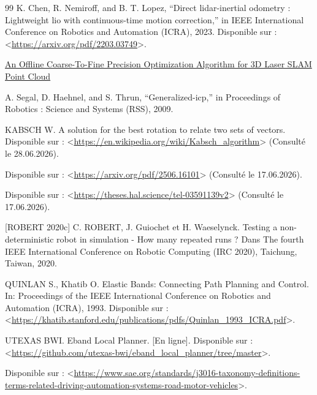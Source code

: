 \begin{thebibliography}{99}
K. Chen, R. Nemiroff, and B. T. Lopez, “Direct lidar-inertial odometry : Lightweight lio with continuous-time motion correction,” in IEEE International Conference on Robotics and Automation (ICRA), 2023. Disponible sur : <\href{https://arxiv.org/pdf/2203.03749}{https://arxiv.org/pdf/2203.03749}>.

\href{https://www.researchgate.net/publication/336438983_An_Offline_Coarse-To-Fine_Precision_Optimization_Algorithm_for_3D_Laser_SLAM_Point_Cloud}{An Offline Coarse-To-Fine Precision Optimization Algorithm for 3D Laser SLAM Point Cloud}

A. Segal, D. Haehnel, and S. Thrun, “Generalized-icp,” in Proceedings of Robotics : Science and Systems (RSS), 2009.

KABSCH W. A solution for the best rotation to relate two sets of vectors. Disponible sur : <\href{https://en.wikipedia.org/wiki/Kabsch_algorithm}{https://en.wikipedia.org/wiki/Kabsch_algorithm}> (Consulté le 28.06.2026).

Disponible sur : <\href{https://arxiv.org/pdf/2506.16101}{https://arxiv.org/pdf/2506.16101}> (Consulté le 17.06.2026).

Disponible sur : <\href{https://theses.hal.science/tel-03591139v2}{https://theses.hal.science/tel-03591139v2}> (Consulté le 17.06.2026).

[ROBERT 2020c] C. ROBERT, J. Guiochet et H. Waeselynck. Testing a non-deterministic robot in simulation - How many repeated runs ? Dans The fourth IEEE International Conference on Robotic Computing (IRC 2020), Taichung, Taiwan, 2020.

QUINLAN S., Khatib O. Elastic Bands: Connecting Path Planning and Control. In: Proceedings of the IEEE International Conference on Robotics and Automation (ICRA), 1993. Disponible sur : <\href{https://khatib.stanford.edu/publications/pdfs/Quinlan_1993_ICRA.pdf}{https://khatib.stanford.edu/publications/pdfs/Quinlan_1993_ICRA.pdf}>.

UTEXAS BWI. Eband Local Planner. [En ligne]. Disponible sur : <\href{https://github.com/utexas-bwi/eband_local_planner/tree/master}{https://github.com/utexas-bwi/eband_local_planner/tree/master}>.

Disponible sur : <\href{https://www.sae.org/standards/j3016-taxonomy-definitions-terms-related-driving-automation-systems-road-motor-vehicles}{https://www.sae.org/standards/j3016-taxonomy-definitions-terms-related-driving-automation-systems-road-motor-vehicles}>.
    
\end{thebibliography}  